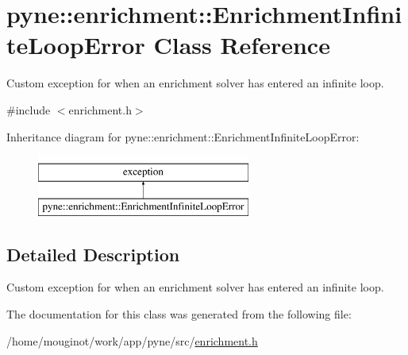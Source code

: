 \hypertarget{classpyne_1_1enrichment_1_1_enrichment_infinite_loop_error}{}\section{pyne\+:\+:enrichment\+:\+:Enrichment\+Infinite\+Loop\+Error Class Reference}
\label{classpyne_1_1enrichment_1_1_enrichment_infinite_loop_error}


Custom exception for when an enrichment solver has entered an infinite loop.  




{\ttfamily \#include $<$enrichment.\+h$>$}

Inheritance diagram for pyne\+:\+:enrichment\+:\+:Enrichment\+Infinite\+Loop\+Error\+:\begin{figure}[H]
\begin{center}
\leavevmode
\includegraphics[height=2.000000cm]{classpyne_1_1enrichment_1_1_enrichment_infinite_loop_error}
\end{center}
\end{figure}


\subsection{Detailed Description}
Custom exception for when an enrichment solver has entered an infinite loop. 

The documentation for this class was generated from the following file\+:\begin{DoxyCompactItemize}
\item 
/home/mouginot/work/app/pyne/src/\hyperlink{enrichment_8h}{enrichment.\+h}\end{DoxyCompactItemize}
